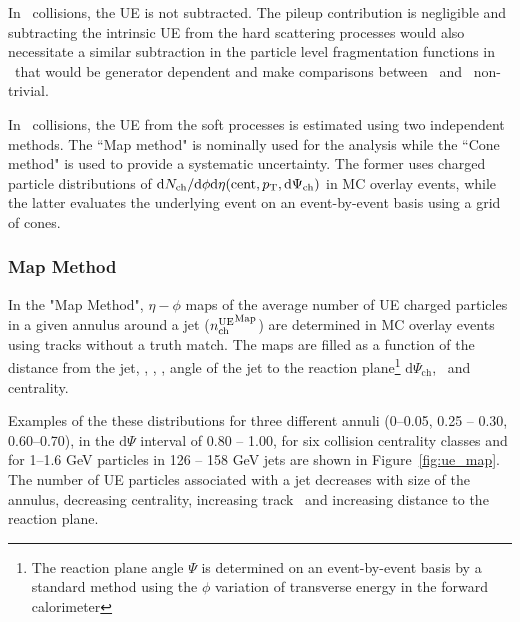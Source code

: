In \pp\ collisions, the UE is not subtracted.
The pileup contribution is negligible and subtracting the intrinsic UE from the hard scattering processes would also necessitate a similar subtraction in the particle level fragmentation functions in \pbpb\ that would be generator dependent and make comparisons between \pp\ and \pbpb\ non-trivial.

In \pbpb\ collisions, the UE from the soft processes is estimated using two independent methods.
The ``Map method" is nominally used for the analysis while the ``Cone method" is used to provide a systematic uncertainty.
The former uses charged particle distributions of $\mathrm{d}N_{\mathrm{ch}}/\mathrm{d}\phi\mathrm{d}\eta(\mathrm{cent},\mbox{$p_{\mathrm{T}}$}, \mathrm{d}\Psi_{\mathrm{ch}})$ in MC overlay events, while the latter evaluates the underlying event on an event-by-event basis using a grid of cones.

\subsubsection{Map Method}
\label{sec:map_method}
In the "Map Method", $\eta-\phi$ maps of the average number of UE charged particles in a given annulus around a jet ($\mbox{$n_{\mathrm{ch}}^{\mathrm{UE}}$}^{\mathrm{Map}}$) are determined in MC overlay events using tracks without a truth match.
The maps are filled as a function of the distance from the jet, \ptjet, \etajet, \phijet, angle of the jet to the reaction plane\footnote{The reaction plane angle $\Psi$ is determined on an event-by-event basis by a standard method using the $\phi$ variation of transverse energy in the forward calorimeter} $ \mathrm{d}\Psi_{\mathrm{ch}}$, \pt\ and centrality.

Examples of the these distributions for three different annuli (0--0.05, 0.25 -- 0.30, 0.60--0.70), in the $\mathrm{d}\Psi$ interval of  0.80 -- 1.00, for six collision centrality classes and for 1--1.6 GeV particles in 126 -- 158 GeV jets are shown in Figure~\ref{fig:ue_map}.
The number of UE particles associated with a jet decreases with size of the annulus, decreasing centrality, increasing track \pT\ and increasing distance to the reaction plane.

